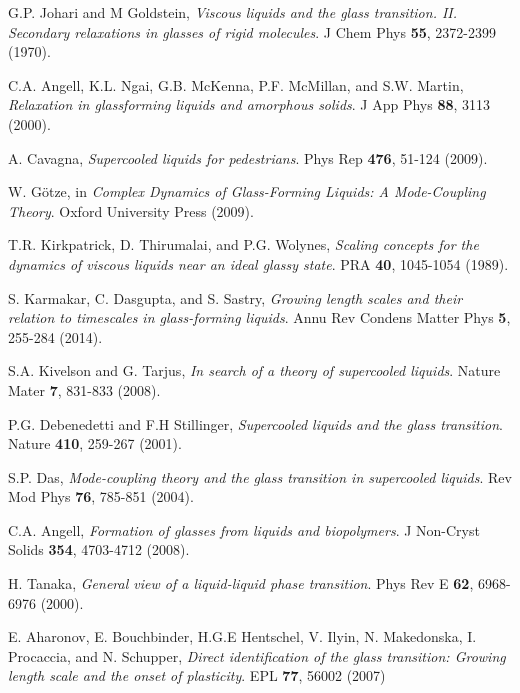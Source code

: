 \documentclass[aps,prl,preprint,showpacs,amsmath,floatfix,superscriptaddress]{revtex4}
\begin{document}
\begin{thebibliography}{}

G.P. Johari and M Goldstein, \textit{Viscous liquids and the glass transition. II. Secondary relaxations in glasses of rigid molecules}. J Chem Phys \textbf{55}, 2372-2399 (1970).

C.A. Angell, K.L. Ngai, G.B. McKenna, P.F. McMillan, and S.W. Martin, \textit{Relaxation in glassforming liquids and amorphous solids}. J App Phys \textbf{88}, 3113 (2000).

A. Cavagna, \textit{Supercooled liquids for pedestrians}. Phys Rep \textbf{476}, 51-124 (2009).

W. G{\"o}tze, in \textit{Complex Dynamics of Glass-Forming Liquids: A Mode-Coupling Theory}. Oxford University Press (2009).

T.R. Kirkpatrick, D. Thirumalai, and P.G. Wolynes, \textit{Scaling concepts for the dynamics of viscous liquids near an ideal glassy state}. PRA \textbf{40}, 1045-1054 (1989).

S. Karmakar, C. Dasgupta, and S. Sastry, \textit{Growing length scales and their relation to timescales in glass-forming liquids}. Annu Rev Condens Matter Phys \textbf{5}, 255-284 (2014).

S.A. Kivelson and G. Tarjus, \textit{In search of a theory of supercooled liquids}. Nature Mater \textbf{7}, 831-833 (2008).

P.G. Debenedetti and F.H Stillinger, \textit{Supercooled liquids and the glass transition}. Nature \textbf{410}, 259-267 (2001).

S.P. Das, \textit{Mode-coupling theory and the glass transition in supercooled liquids}. Rev Mod Phys \textbf{76}, 785-851 (2004).

C.A. Angell, \textit{Formation of glasses from liquids and biopolymers}. J Non-Cryst Solids \textbf{354}, 4703-4712 (2008).

H. Tanaka, \textit{General view of a liquid-liquid phase transition}. Phys Rev E \textbf{62}, 6968-6976 (2000).

E. Aharonov, E. Bouchbinder, H.G.E Hentschel, V. Ilyin, N. Makedonska, I. Procaccia, and N. Schupper, \textit{Direct identification of the glass transition: Growing length scale and the onset of plasticity}. EPL \textbf{77}, 56002 (2007)


\end{thebibliography}
\end{document}
